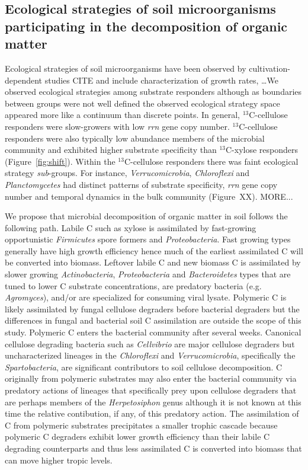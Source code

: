\subsection{Ecological strategies of soil microorganisms participating in the
    decomposition of organic matter}
\label{sub:ecological_strategies}
Ecological strategies of soil microorganisms have been observed by
cultivation-dependent studies CITE and include characterization of growth
rates, \ldots  We observed ecological strategies among substrate
responders although as boundaries between groups were not well defined the
observed ecological strategy space appeared more like a continuum than discrete
points. In general, $^{13}$C-cellulose responders were slow-growers with low
\textit{rrn} gene copy number. $^{13}$C-cellulose responders were also
typically low abundance members of the microbial community and exhibited higher
substrate specificity than $^{13}$C-xylose responders (Figure~\ref{fig:shift}).
Within the $^{13}$C-cellulose responders there was faint 
ecological strategy \textit{sub}-groups. For instance,
\textit{Verrucomicrobia}, \textit{Chloroflexi} and \textit{Planctomycetes} had
distinct patterns of substrate specificity, \textit{rrn} gene copy number and
temporal dynamics in the bulk community (Figure~XX). MORE...

We propose that microbial decomposition of organic matter in soil follows the
following path. Labile C such as xylose is assimilated by fast-growing
opportunistic \textit{Firmicutes} spore formers and \textit{Proteobacteria}.
Fast growing types generally have high growth efficiency hence much of the
earliest assimilated C will be converted into biomass. Leftover labile C and
new biomass C is assimilated by slower growing \textit{Actinobacteria},
\textit{Proteobacteria} and \textit{Bacteroidetes} types that are tuned to
lower C substrate concentrations, are predatory bacteria (e.g. \textit{Agromyces}),
and/or are specialized for consuming viral lysate. Polymeric C is likely
assimilated by fungal cellulose degraders before bacterial degraders but the
differences in fungal and bacterial soil C assimilation are outside the scope
of this study. Polymeric C enters the bacterial community after several weeks.
Canonical cellulose degrading bacteria such as \textit{Cellvibrio} are major
cellulose degraders but uncharacterized lineages in the \textit{Chloroflexi}
and \textit{Verrucomicrobia}, specifically the \textit{Spartobacteria}, are
significant contributors to soil cellulose decomposition. C originally from
polymeric substrates may also enter the bacterial community via predatory
actions of lineages that specifically prey upon cellulose degraders that are
perhaps members of the \textit{Herpetosiphon} genus although it is not known at
this time the relative contibution, if any, of this predatory action. The assimilation of
C from polymeric substrates precipitates a smaller trophic cascade because
polymeric C degraders exhibit lower growth efficiency than their labile C
degrading counterparts and thus less assimilated C is converted into biomass that
can move higher tropic levels.

